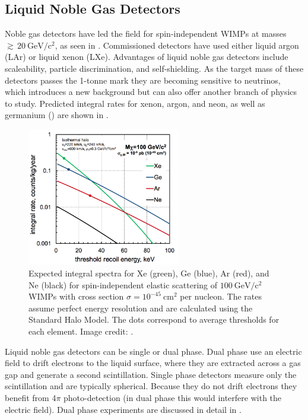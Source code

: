 \subsection{Liquid Noble Gas Detectors} \label{subsec:noble_gas}
Noble gas detectors have led the field for spin-independent WIMPs at masses ${\gtrsim}\, 20\ \mathrm{GeV/c^2}$, as seen in
.  Commissioned detectors have used either liquid argon (LAr) or liquid xenon (LXe).  Advantages of liquid noble gas
detectors
include scaleability, particle discrimination, and self-shielding.  As the target mass of these detectors passes
the 1-tonne mark they are becoming sensitive to neutrinos, which introduces a new background but can also offer another branch of physics
to study.  Predicted integral rates for xenon, argon, and neon, as well as germanium () are shown in
.

\begin{figure}
\centering
\includegraphics[width=0.6\textwidth]{IntegralRateTargets}
\caption[Expected integral spectra for Xe (green), Ge (blue), Ar (red), and Ne (black) for spin-independent elastic scattering of
$100\ \mathrm{GeV/c^2}$ WIMPs with
cross section $\sigma = 10^{-45}\ \mathrm{cm^{2}}$ per nucleon.]{Expected integral spectra for Xe (green), Ge (blue), Ar (red), and Ne
(black) for spin-independent elastic scattering of $100\ \mathrm{GeV/c^2}$ WIMPs with
cross section $\sigma = 10^{-45}\ \mathrm{cm^{2}}$ per nucleon.  The rates assume perfect energy resolution and are calculated using the
Standard Halo Model.  The dots correspond to average thresholds for each element.  Image credit: .}
\label{fig:material_wimp_rate}
\end{figure}

Liquid noble gas detectors can be single or dual phase.  Dual phase use an electric field to drift electrons to the liquid surface, where
they are extracted across a gas gap and generate a second scintillation.  Single phase detectors measure only the scintillation and are
typically
spherical.  Because they do not drift electrons they benefit from 4$\pi$ photo-detection (in dual phase this would interfere with the
electric field).  Dual phase experiments are discussed in detail in .

